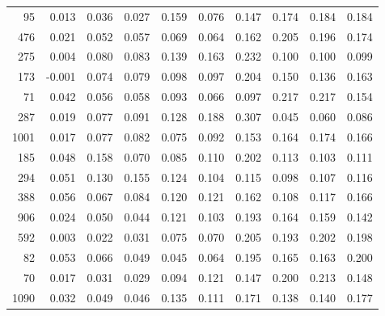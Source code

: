 \begin{longtable}{rrrrrrrrrr}
    95 &  0.013 & 0.036 & 0.027 & 0.159 & 0.076 & 0.147 & 0.174 & 0.184 & 0.184 \\
   476 &  0.021 & 0.052 & 0.057 & 0.069 & 0.064 & 0.162 & 0.205 & 0.196 & 0.174 \\
   275 &  0.004 & 0.080 & 0.083 & 0.139 & 0.163 & 0.232 & 0.100 & 0.100 & 0.099 \\
   173 & -0.001 & 0.074 & 0.079 & 0.098 & 0.097 & 0.204 & 0.150 & 0.136 & 0.163 \\
    71 &  0.042 & 0.056 & 0.058 & 0.093 & 0.066 & 0.097 & 0.217 & 0.217 & 0.154 \\
   287 &  0.019 & 0.077 & 0.091 & 0.128 & 0.188 & 0.307 & 0.045 & 0.060 & 0.086 \\
  1001 &  0.017 & 0.077 & 0.082 & 0.075 & 0.092 & 0.153 & 0.164 & 0.174 & 0.166 \\
   185 &  0.048 & 0.158 & 0.070 & 0.085 & 0.110 & 0.202 & 0.113 & 0.103 & 0.111 \\
   294 &  0.051 & 0.130 & 0.155 & 0.124 & 0.104 & 0.115 & 0.098 & 0.107 & 0.116 \\
   388 &  0.056 & 0.067 & 0.084 & 0.120 & 0.121 & 0.162 & 0.108 & 0.117 & 0.166 \\
   906 &  0.024 & 0.050 & 0.044 & 0.121 & 0.103 & 0.193 & 0.164 & 0.159 & 0.142 \\
   592 &  0.003 & 0.022 & 0.031 & 0.075 & 0.070 & 0.205 & 0.193 & 0.202 & 0.198 \\
    82 &  0.053 & 0.066 & 0.049 & 0.045 & 0.064 & 0.195 & 0.165 & 0.163 & 0.200 \\
    70 &  0.017 & 0.031 & 0.029 & 0.094 & 0.121 & 0.147 & 0.200 & 0.213 & 0.148 \\
  1090 &  0.032 & 0.049 & 0.046 & 0.135 & 0.111 & 0.171 & 0.138 & 0.140 & 0.177 \\
\end{longtable}
